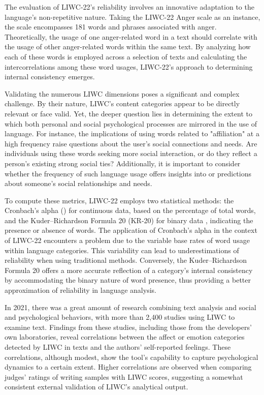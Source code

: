 The evaluation of LIWC-22's reliability involves an innovative adaptation to the language's non-repetitive nature. Taking the LIWC-22 Anger scale as an instance, the scale encompasses 181 words and phrases associated with anger. Theoretically, the usage of one anger-related word in a text should correlate with the usage of other anger-related words within the same text. By analyzing how each of these words is employed across a selection of texts and calculating the intercorrelations among these word usages, LIWC-22's approach to determining internal consistency emerges\cite{boyd2022development}.

Validating the numerous LIWC dimensions poses a significant and complex challenge. By their nature, LIWC's content categories appear to be directly relevant or face valid. Yet, the deeper question lies in determining the extent to which both personal and social psychological processes are mirrored in the use of language. For instance, the implications of using words related to "affiliation" at a high frequency raise questions about the user's social connections and needs. Are individuals using these words seeking more social interaction, or do they reflect a person's existing strong social ties? Additionally, it is important to consider whether the frequency of such language usage offers insights into or predictions about someone's social relationships and needs.

To compute these metrics, LIWC-22 employs two statistical methods: the Cronbach’s alpha (\textalpha) for continuous data, based on the percentage of total words, and the Kuder–Richardson Formula 20 (KR-20) for binary data \cite{kuder1937theory}, indicating the presence or absence of words. The application of Cronbach’s alpha in the context of LIWC-22 encounters a problem due to the variable base rates of word usage within language categories. This variability can lead to underestimations of reliability when using traditional methods. Conversely, the Kuder–Richardson Formula 20 offers a more accurate reflection of a category's internal consistency by accommodating the binary nature of word presence, thus providing a better approximation of reliability in language analysis.

In 2021, there was a great amount of research combining text analysis and social and psychological behaviors, with more than 2,400 studies using LIWC to examine text. Findings from these studies, including those from the developers' own laboratories, reveal correlations between the affect or emotion categories detected by LIWC in texts and the authors' self-reported feelings. These correlations, although modest, show the tool's capability to capture psychological dynamics to a certain extent. Higher correlations are observed when comparing judges' ratings of writing samples with LIWC scores, suggesting a somewhat consistent external validation of LIWC's analytical output\cite{boyd2022development}.
